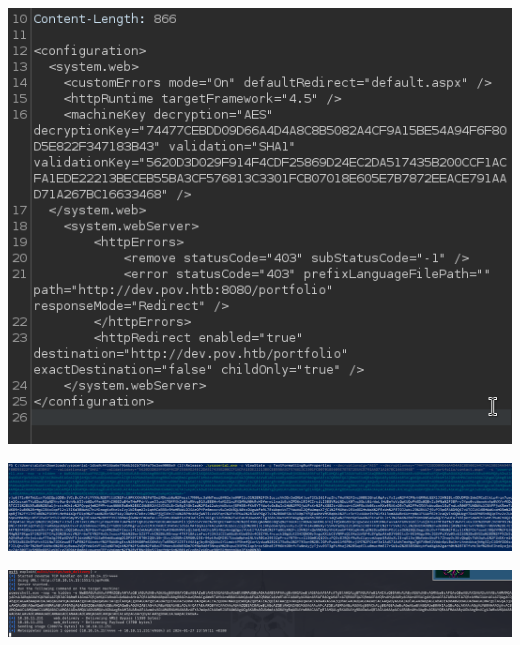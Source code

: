 \documentclass[a4paper]{article}
\begin{document}
              \begin{minipage}[c]{\textwidth}
          \centering
          \includegraphics[width=\textwidth]{src/issues/2 - POV/issue24.png}
          \label{2:POV:issue.md:issue24.png}
          \vspace{4ex}
        \end{minipage}
              \begin{minipage}[c]{\textwidth}
          \centering
          \includegraphics[width=\textwidth]{src/issues/2 - POV/issue25.png}
          \label{2:POV:issue.md:issue25.png}
          \vspace{4ex}
        \end{minipage}
              \begin{minipage}[c]{\textwidth}
          \centering
          \includegraphics[width=\textwidth]{src/issues/2 - POV/issue26.png}
          \label{2:POV:issue.md:issue26.png}
          \vspace{4ex}
        \end{minipage}
          
\end{document}
